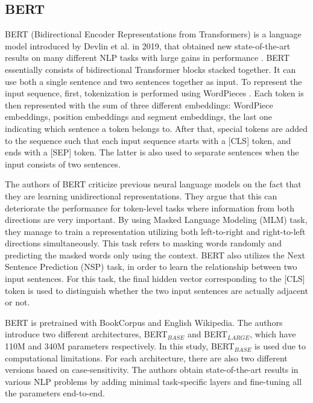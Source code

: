 \documentclass{report}
\theoremstyle{definition}
\theoremstyle{remark}
\begin{document}
\subsection{BERT}
BERT (Bidirectional Encoder Representations from
Transformers) is a language model introduced by Devlin et al. in 2019, that obtained new state-of-the-art results on many different NLP tasks with large gains in performance \cite{BERT}. BERT essentially consists of bidirectional Transformer \cite{transformer} blocks stacked together. It can use both a single sentence and two sentences together as input. To represent the input sequence, first, tokenization is performed using WordPieces \cite{wordpiece}. Each token is then represented with the sum of three different embeddings: WordPiece embeddings, position embeddings and segment embeddings, the last one indicating which sentence a token belongs to. After that, special tokens are added to the sequence such that each input sequence starts with a [CLS] token, and ends with a [SEP] token. The latter is also used to separate sentences when the input consists of two sentences. 

The authors of BERT criticize previous neural language models on the fact that they are learning unidirectional representations. They argue that this can deteriorate the performance for token-level tasks where information from both directions are very important. By using Masked Language Modeling (MLM) task, they manage to train a representation utilizing both left-to-right and right-to-left directions simultaneously. This task refers to masking words randomly and predicting the masked words only using the context. BERT also utilizes the Next Sentence Prediction (NSP) task, in order to learn the relationship between two input sentences. For this task, the final hidden vector corresponding to the [CLS] token is used to distinguish whether the two input sentences are actually adjacent or not.

BERT is pretrained with BookCorpus \cite{bookscorpus} and English Wikipedia. The authors introduce two different architectures, BERT$_{BASE}$ and BERT$_{LARGE}$, which have 110M and 340M parameters respectively. In this study, BERT$_{BASE}$ is used due to computational limitations. For each architecture, there are also two different versions based on case-sensitivity. The authors obtain state-of-the-art results in various NLP problems by adding minimal task-specific layers and fine-tuning all the parameters end-to-end.
\end{document}

